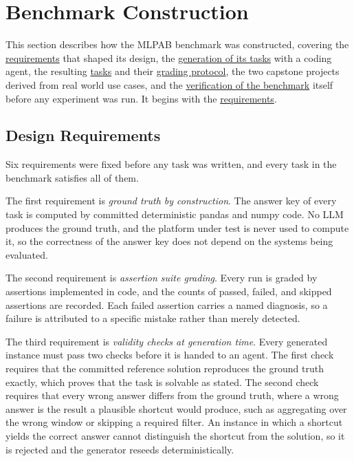 \documentclass[
english,                 %
bibtex,                  %
]{kththesis}
\numberwithin{listing}{chapter}
\begin{document}
\section{Benchmark Construction}
\label{sec:method_benchmark_construction}
\glsresetall

This section describes how the \gls{MLPAB} benchmark was constructed, covering the \hyperref[sec:method_design_requirements]{requirements} that shaped its design, the \hyperref[sec:method_task_generation]{generation of its tasks} with a coding agent, the resulting \hyperref[sec:method_task_overview]{tasks} and their \hyperref[sec:method_grading_deliverables]{grading protocol}, the two capstone projects derived from real world use cases, and the \hyperref[sec:method_benchmark_verification]{verification of the benchmark} itself before any experiment was run. It begins with the \hyperref[sec:method_design_requirements]{requirements}.

\subsection{Design Requirements}
\label{sec:method_design_requirements}
\glsresetall

Six requirements were fixed before any task was written, and every task in the benchmark satisfies all of them.

The first requirement is \emph{ground truth by construction}. The answer key of every task is computed by committed deterministic pandas and numpy code. No \gls{LLM} produces the ground truth, and the platform under test is never used to compute it, so the correctness of the answer key does not depend on the systems being evaluated.

The second requirement is \emph{assertion suite grading}. Every run is graded by assertions implemented in code, and the counts of passed, failed, and skipped assertions are recorded. Each failed assertion carries a named diagnosis, so a failure is attributed to a specific mistake rather than merely detected.

The third requirement is \emph{validity checks at generation time}. Every generated instance must pass two checks before it is handed to an agent. The first check requires that the committed reference solution reproduces the ground truth exactly, which proves that the task is solvable as stated. The second check requires that every wrong answer differs from the ground truth, where a wrong answer is the result a plausible shortcut would produce, such as aggregating over the wrong window or skipping a required filter. An instance in which a shortcut yields the correct answer cannot distinguish the shortcut from the solution, so it is rejected and the generator reseeds deterministically.
\end{document}
